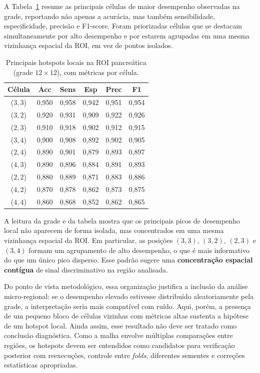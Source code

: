 \documentclass[11pt,a4paper]{article}
\begin{document}
A Tabela~\ref{tab:roi-pancreas-metricas-locais} resume as principais células de maior desempenho observadas na grade, reportando não apenas a acurácia, mas também sensibilidade, especificidade, precisão e F1-score. Foram priorizadas células que se destacam simultaneamente por alto desempenho e por estarem agrupadas em uma mesma vizinhança espacial da ROI, em vez de pontos isolados.

\begin{table}[htbp]
\centering
\caption{Principais hotspots locais na ROI pancreática (grade \(12\times 12\)), com métricas por célula.}
\label{tab:roi-pancreas-metricas-locais}
\small
\setlength{\tabcolsep}{4pt}
\renewcommand{\arraystretch}{1.12}
\begin{tabular}{cccccc}
\toprule
\textbf{Célula} & \textbf{Acc} & \textbf{Sens} & \textbf{Esp} & \textbf{Prec} & \textbf{F1} \\
\midrule
(\(3,3\)) & 0,950 & 0,958 & 0,942 & 0,951 & 0,954 \\
(\(3,2\)) & 0,920 & 0,931 & 0,909 & 0,922 & 0,926 \\
(\(2,3\)) & 0,910 & 0,918 & 0,902 & 0,912 & 0,915 \\
(\(3,4\)) & 0,900 & 0,908 & 0,892 & 0,902 & 0,905 \\
(\(2,4\)) & 0,890 & 0,901 & 0,879 & 0,893 & 0,897 \\
(\(4,3\)) & 0,890 & 0,896 & 0,884 & 0,891 & 0,893 \\
(\(2,2\)) & 0,880 & 0,889 & 0,871 & 0,883 & 0,886 \\
(\(4,2\)) & 0,870 & 0,878 & 0,862 & 0,873 & 0,875 \\
(\(4,4\)) & 0,860 & 0,868 & 0,852 & 0,862 & 0,865 \\
\bottomrule
\end{tabular}
\end{table}

A leitura da grade e da tabela mostra que os principais picos de desempenho local não aparecem de forma isolada, mas concentrados em uma mesma vizinhança espacial da ROI. Em particular, as posições \((3,3)\), \((3,2)\), \((2,3)\) e \((3,4)\) formam um agrupamento de alto desempenho, o que é mais informativo do que um único pico disperso. Esse padrão sugere uma \textbf{concentração espacial contígua} de sinal discriminativo na região analisada.

Do ponto de vista metodológico, essa organização justifica a inclusão da análise micro-regional: se o desempenho elevado estivesse distribuído aleatoriamente pela grade, a interpretação seria mais compatível com ruído. Aqui, porém, a presença de um pequeno bloco de células vizinhas com métricas altas sustenta a hipótese de um hotspot local. Ainda assim, esse resultado não deve ser tratado como conclusão diagnóstica. Como a malha envolve múltiplas comparações entre regiões, os hotspots devem ser entendidos como candidatos para verificação posterior com reexecuções, controle entre \textit{folds}, diferentes sementes e correções estatísticas apropriadas.
\end{document}
